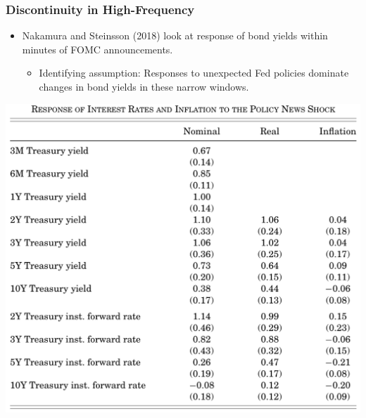 \documentclass[english,xcolor=svgnames]{beamer}
\begin{document}
\begin{frame}
\frametitle{Discontinuity in High-Frequency}
\begin{itemize}
	\item Nakamura and Steinsson (2018) look at response of bond yields within minutes of FOMC announcements.
	\begin{itemize}
		\item Identifying assumption: Responses to unexpected Fed policies dominate changes in bond yields in these narrow windows.
	\end{itemize}
\end{itemize}
\centering
\includegraphics[scale=0.3]{../../Images/NS2018realrate.png}
\end{frame}

\end{document}
